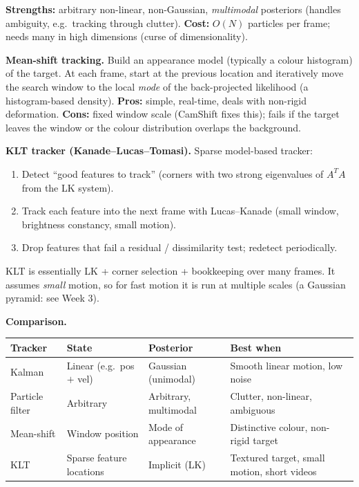 \textbf{Strengths:} arbitrary non-linear, non-Gaussian, \emph{multimodal} posteriors (handles ambiguity, e.g.\ tracking through clutter). \textbf{Cost:} $O(N)$ particles per frame; needs many in high dimensions (curse of dimensionality).

\separator

\textbf{Mean-shift tracking.} Build an appearance model (typically a colour histogram) of the target. At each frame, start at the previous location and iteratively move the search window to the local \emph{mode} of the back-projected likelihood (a histogram-based density). \textbf{Pros:} simple, real-time, deals with non-rigid deformation. \textbf{Cons:} fixed window scale (CamShift fixes this); fails if the target leaves the window or the colour distribution overlaps the background.

\textbf{KLT tracker (Kanade--Lucas--Tomasi).} Sparse model-based tracker:
\begin{enumerate}
  \item Detect ``good features to track'' (corners with two strong eigenvalues of $A^T A$ from the LK system).
  \item Track each feature into the next frame with Lucas--Kanade (small window, brightness constancy, small motion).
  \item Drop features that fail a residual / dissimilarity test; redetect periodically.
\end{enumerate}
KLT is essentially LK + corner selection + bookkeeping over many frames. It assumes \emph{small} motion, so for fast motion it is run at multiple scales (a Gaussian pyramid: see Week 3).

\separator

\textbf{Comparison.}

\begin{center}
\renewcommand{\arraystretch}{1.3}
\begin{tabular}{@{} l l l p{4.5cm} @{}}
\toprule
\textbf{Tracker} & \textbf{State} & \textbf{Posterior} & \textbf{Best when} \\
\midrule
Kalman & Linear (e.g.\ pos $+$ vel) & Gaussian (unimodal) & Smooth linear motion, low noise \\
Particle filter & Arbitrary & Arbitrary, multimodal & Clutter, non-linear, ambiguous \\
Mean-shift & Window position & Mode of appearance & Distinctive colour, non-rigid target \\
KLT & Sparse feature locations & Implicit (LK) & Textured target, small motion, short videos \\
\bottomrule
\end{tabular}
\end{center}

